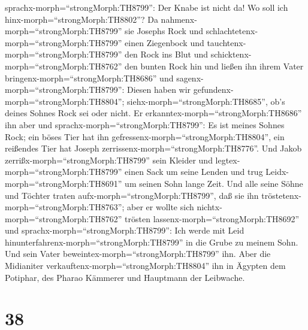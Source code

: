 sprachx-morph=``strongMorph:TH8799'': Der Knabe ist nicht da! Wo soll
ich hinx-morph=``strongMorph:TH8802''?  Da
nahmenx-morph=``strongMorph:TH8799'' sie Josephs Rock und
schlachtetenx-morph=``strongMorph:TH8799'' einen Ziegenbock und
tauchtenx-morph=``strongMorph:TH8799'' den Rock ins Blut 
und schicktenx-morph=``strongMorph:TH8762'' den bunten Rock hin und
ließen ihn ihrem Vater bringenx-morph=``strongMorph:TH8686'' und
sagenx-morph=``strongMorph:TH8799'': Diesen haben wir
gefundenx-morph=``strongMorph:TH8804'';
siehx-morph=``strongMorph:TH8685'', ob's deines Sohnes Rock sei oder
nicht.  Er erkanntex-morph=``strongMorph:TH8686'' ihn aber
und sprachx-morph=``strongMorph:TH8799'': Es ist meines Sohnes Rock; ein
böses Tier hat ihn gefressenx-morph=``strongMorph:TH8804'', ein
reißendes Tier hat Joseph zerrissenx-morph=``strongMorph:TH8776''.
 Und Jakob zerrißx-morph=``strongMorph:TH8799'' sein
Kleider und legtex-morph=``strongMorph:TH8799'' einen Sack um seine
Lenden und trug Leidx-morph=``strongMorph:TH8691'' um seinen Sohn lange
Zeit.  Und alle seine Söhne und Töchter traten
aufx-morph=``strongMorph:TH8799'', daß sie ihn
tröstetenx-morph=``strongMorph:TH8763''; aber er wollte sich
nichtx-morph=``strongMorph:TH8762'' trösten
lassenx-morph=``strongMorph:TH8692'' und
sprachx-morph=``strongMorph:TH8799'': Ich werde mit Leid
hinunterfahrenx-morph=``strongMorph:TH8799'' in die Grube zu meinem
Sohn. Und sein Vater beweintex-morph=``strongMorph:TH8799'' ihn.
 Aber die Midianiter
verkauftenx-morph=``strongMorph:TH8804'' ihn in Ägypten dem Potiphar,
des Pharao Kämmerer und Hauptmann der Leibwache.

\hypertarget{section-37}{%
\section{38}\label{section-37}}

